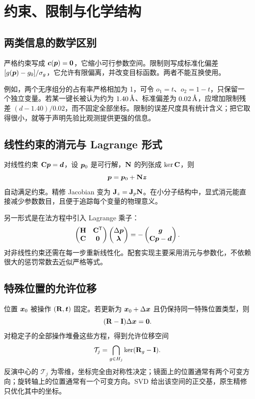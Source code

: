 \chapter{约束、限制与化学结构}
\section{两类信息的数学区别}
严格约束写成 $\bm{c}(\bm{p})=\bm{0}$，它缩小可行参数空间。限制则写成标准化偏差 $[g(\bm{p})-g_0]/\sigma_g$，它允许有限偏离，并改变目标函数。两者不能互换使用。

例如，两个无序组分的占有率严格相加为 1，可令 $o_1=t$、$o_2=1-t$，只保留一个独立变量。若某一键长被认为约为 $1.40\,\text{\AA}$、标准偏差为 $0.02\,\text{\AA}$，应增加限制残差 $(d-1.40)/0.02$，而不固定全部坐标。限制的误差尺度具有统计含义；把它取得很小，就等于声明先验比观测提供更强的信息。

\section{线性约束的消元与 Lagrange 形式}
对线性约束 $\mathbf{C}\bm{p}=\bm{d}$，设 $\bm{p}_0$ 是可行解，$\mathbf{N}$ 的列张成 $\ker\mathbf{C}$，则
\begin{equation}
\bm{p}=\bm{p}_0+\mathbf{N}\bm{z}
\end{equation}
自动满足约束。精修 Jacobian 变为 $\mathbf{J}_z=\mathbf{J}_p\mathbf{N}$。在小分子结构中，显式消元能直接减少参数数目，且便于追踪每个变量的物理意义。

另一形式是在法方程中引入 Lagrange 乘子：
\begin{equation}
\begin{pmatrix}
\mathbf{H}&\mathbf{C}^{\mathsf T}\\
\mathbf{C}&\mathbf{0}
\end{pmatrix}
\begin{pmatrix}\Delta\bm{p}\\\bm{\lambda}\end{pmatrix}
=-
\begin{pmatrix}\bm{g}\\\mathbf{C}\bm{p}-\bm{d}\end{pmatrix}.
\end{equation}
对非线性约束还需在每一步重新线性化。配套实现主要采用消元与参数化，不依赖很大的惩罚常数去近似严格等式。

\section{特殊位置的允许位移}
位置 $\bm{x}_0$ 被操作 $(\mathbf{R},\bm{t})$ 固定。若更新为 $\bm{x}_0+\Delta\bm{x}$ 且仍保持同一特殊位置类型，则
\begin{equation}
(\mathbf{R}-\mathbf{I})\Delta\bm{x}=\bm{0}.
\end{equation}
对稳定子的全部操作堆叠这些方程，得到允许位移空间
\begin{equation}
\mathcal T_j=\bigcap_{g\in H_j}\ker(\mathbf{R}_g-\mathbf{I}).
\end{equation}
反演中心的 $\mathcal T_j$ 为零维，坐标完全由对称性决定；镜面上的位置通常有两个可变方向；旋转轴上的位置通常有一个可变方向。SVD 给出该空间的正交基，原生精修只优化其中的坐标。

